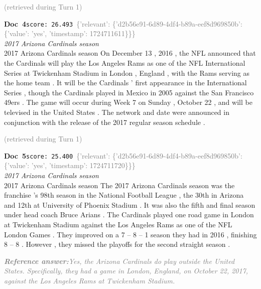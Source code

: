 \documentclass[a4paper,11pt]{article}
\begin{document}
\hfill{\tiny\textcolor{gray}{(retrieved during Turn 1)}}
\begin{docenv}
{\footnotesize\textcolor{doccolor}{\textbf{Doc~4}}}\hfill{\tiny\texttt{score:~26.493}}\ {\tiny\textcolor{gray}{\{'relevant': \{'d2b56e91-6d89-4df4-b89a-eef8d969850b': \{'value': 'yes', 'timestamp': 1724711611\}\}\}}}\\[3pt]
{\small\textit{2017 Arizona Cardinals season}}\\[2pt]
\vspace{2pt}
{\footnotesize 2017 Arizona Cardinals season
On December 13 , 2016 , the NFL announced that the Cardinals will play the Los Angeles Rams as one of the NFL International Series at Twickenham Stadium in London , England , with the Rams serving as the home team . It will be the Cardinals ' first appearance in the International Series , though the Cardinals played in Mexico in 2005 against the San Francisco 49ers . The game will occur during Week 7 on Sunday , October 22 , and will be televised in the United States . The network and date were announced in conjunction with the release of the 2017 regular season schedule .}
\end{docenv}
\hfill{\tiny\textcolor{gray}{(retrieved during Turn 1)}}
\begin{docenv}
{\footnotesize\textcolor{doccolor}{\textbf{Doc~5}}}\hfill{\tiny\texttt{score:~25.400}}\ {\tiny\textcolor{gray}{\{'relevant': \{'d2b56e91-6d89-4df4-b89a-eef8d969850b': \{'value': 'yes', 'timestamp': 1724711720\}\}\}}}\\[3pt]
{\small\textit{2017 Arizona Cardinals season}}\\[2pt]
\vspace{2pt}
{\footnotesize 2017 Arizona Cardinals season
The 2017 Arizona Cardinals season was the franchise 's 98th season in the National Football League , the 30th in Arizona and 12th at University of Phoenix Stadium . It was also the fifth and final season under head coach Bruce Arians . The Cardinals played one road game in London at Twickenham Stadium against the Los Angeles Rams as one of the NFL London Games . They improved on a 7 -- 8 -- 1 season they had in 2016 , finishing 8 -- 8 . However , they missed the playoffs for the second straight season .}
\end{docenv}
\begin{refanswerenv}
{\footnotesize\textit{\textcolor{gray}{\textbf{Reference answer:}\enspace Yes, the Arizona Cardinals do play outside the United States. Specifically, they had a game in London, England, on October 22, 2017, against the Los Angeles Rams at Twickenham Stadium.}}}
\end{refanswerenv}
\end{document}
